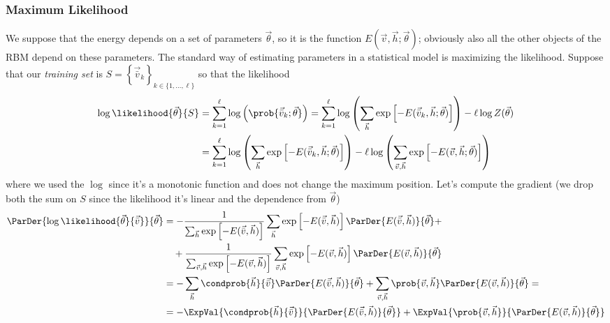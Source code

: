   \subsubsection{Maximum Likelihood}
  We suppose that the energy depends on a set of parameters \(\vec{\theta}\), so it is the function
  \(E(\vec{v}, \vec{h};\vec{\theta})\); obviously also all the other objects of the RBM depend on these parameters. The standard way of estimating parameters in a statistical
  model is maximizing the likelihood. Suppose that our \emph{training set} is 
  \(S = \left\{\vec{\bar{v}}_k\right\}_{k \in \{1,\dots,\ell\}}\) so that the likelihood
  \begin{align*}
    \log\likelihood{\vec{\theta}}{S}
      &= \sum_{k=1}^\ell \log\left(\prob{\vec{\bar{v}}_k;\vec{\theta}}\right)
       = \sum_{k=1}^\ell \log\left(\sum_{\vec{h}} 
                                      \exp\left[-E(\vec{\bar{v}}_k,\vec{h};\vec{\theta})\right]\right)
         -\ell \log{Z(\vec{\theta})} \\
      &= \sum_{k=1}^\ell \log\left(\sum_{\vec{h}} 
                                      \exp\left[-E(\vec{\bar{v}}_k,\vec{h};\vec{\theta})\right]\right)
         -\ell \log\left(\sum_{\vec{v},\vec{h}} 
                                 \exp\left[-E(\vec{v},\vec{h};\vec{\theta})\right]\right)
   \end{align*}
   where we used the \(\log\) since it's a monotonic function and does not change the maximum position.
  Let's compute the gradient (we drop both the sum on \(S\) since the likelihood it's linear and the dependence from \(\vec{\theta}\))
  \begin{align*} \displaystyle
    \ParDer{\log\likelihood{\vec{\theta}}{\vec{\bar{v}}}}{\vec{\theta}}
      &= -\frac{1}{\sum_{\vec{h}}\exp\left[-E(\vec{\bar{v}},\vec{h})\right]}
          \sum_{\vec{h}}\exp\left[-E(\vec{\bar{v}},\vec{h})\right]
          \ParDer{E(\vec{\bar{v}},\vec{h})}{\vec{\theta}}+ \\
      &\quad +\frac{1}{\sum_{\vec{v},\vec{h}}\exp\left[-E(\vec{v},\vec{h})\right]}
          \sum_{\vec{v},\vec{h}}\exp\left[-E(\vec{v},\vec{h})\right]
          \ParDer{E(\vec{v},\vec{h})}{\vec{\theta}} \\
      &= -\sum_{\vec{h}}\condprob{\vec{h}}{\vec{\bar{v}}}
        \ParDer{E(\vec{\bar{v}},\vec{h})}{\vec{\theta}} +
        \sum_{\vec{v},\vec{h}}\prob{\vec{v},\vec{h}}
        \ParDer{E(\vec{v},\vec{h})}{\vec{\theta}} =\\
      &= -\ExpVal{\condprob{\vec{h}}{\vec{\bar{v}}}}{\ParDer{E(\vec{\bar{v}},\vec{h})}{\vec{\theta}}}
         +\ExpVal{\prob{\vec{v},\vec{h}}}{\ParDer{E(\vec{v},\vec{h})}{\vec{\theta}}}
  \end{align*}
  
